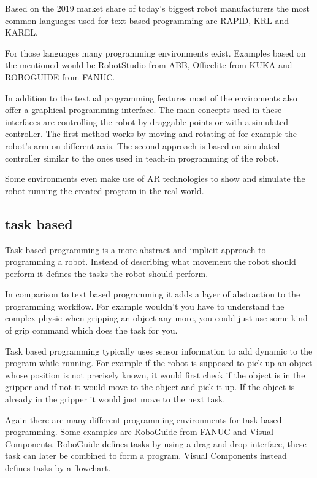 \documentclass[conference]{IEEEtran}
\begin{document}
        Based on the 2019 market share of today's biggest robot manufacturers the most common languages used for text based programming are RAPID, KRL and KAREL. \cite{s1}

        For those languages many programming environments exist. Examples based on the mentioned would be RobotStudio from ABB, Officelite from KUKA and ROBOGUIDE from FANUC.

        In addition to the textual programming features most of the enviroments also offer a graphical programming interface.
        The main concepts used in these interfaces are controlling the robot by draggable points or with a simulated controller.
        The first method works by moving and rotating of for example the robot's arm on different axis. 
        The second approach is based on simulated controller similar to the ones used in teach-in programming of the robot.

        Some environments even make use of AR technologies to show and simulate the robot running the created program in the real world.
        

    \subsection{task based}

        Task based programming is a more abstract and implicit approach to programming a robot.
        Instead of describing what movement the robot should perform it defines the tasks the robot should perform.
       
        In comparison to text based programming it adds a layer of abstraction to the programming workflow. For example wouldn't you have to understand the complex physic when gripping an object any more, you could just use some kind of grip command which does the task for you. %

        Task based programming typically uses sensor information to add dynamic to the program while running. For example if the robot is supposed to pick up an object whose position is not precisely known, it would first check if the object is in the gripper and if not it would move to the object and pick it up. If the object is already in the gripper it would just move to the next task.

        Again there are many different programming environments for task based programming. Some examples are RoboGuide from FANUC and Visual Components. RoboGuide defines tasks by using a drag and drop interface, these task can later be combined to form a program.
        Visual Components instead defines tasks by a flowchart.
\end{document}
